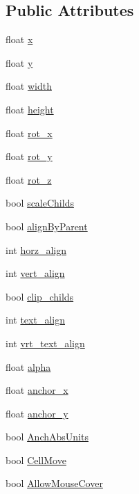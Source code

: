 \subsection*{Public Attributes}
\begin{DoxyCompactItemize}
\item 
float \hyperlink{class_n_g_u_i_symbol_inst_a1616f818b1c5b63b2194e01cbeab360d}{x}
\item 
float \hyperlink{class_n_g_u_i_symbol_inst_abcb24ffd0004c8bc11970c869b918250}{y}
\item 
float \hyperlink{class_n_g_u_i_symbol_inst_a0fc697d401fef1258dbf28bbba42a4d7}{width}
\item 
float \hyperlink{class_n_g_u_i_symbol_inst_a1c0ad8b480d3911404671ca978b947cb}{height}
\item 
float \hyperlink{class_n_g_u_i_symbol_inst_a20bbcca67767c0ed9b3e40e6f3cd0357}{rot\+\_\+x}
\item 
float \hyperlink{class_n_g_u_i_symbol_inst_ac63da3521f289b06c108fa3d6ff380e1}{rot\+\_\+y}
\item 
float \hyperlink{class_n_g_u_i_symbol_inst_a045dc487c09e6c2b2fad30c3b013bc09}{rot\+\_\+z}
\item 
bool \hyperlink{class_n_g_u_i_symbol_inst_a582dd58d99a137dca1c1ec8d8acca4e2}{scale\+Childs}
\item 
bool \hyperlink{class_n_g_u_i_symbol_inst_a2cecb575b74c18fa4a0469d54cd8d52e}{align\+By\+Parent}
\item 
int \hyperlink{class_n_g_u_i_symbol_inst_a08a1618237027dd91cdab7928ff9ad48}{horz\+\_\+align}
\item 
int \hyperlink{class_n_g_u_i_symbol_inst_a2963382c47b7030d04c0a455033da810}{vert\+\_\+align}
\item 
bool \hyperlink{class_n_g_u_i_symbol_inst_ad091c8c1a934c1d782102e1e2b99a6a8}{clip\+\_\+childs}
\item 
int \hyperlink{class_n_g_u_i_symbol_inst_ac95251a56a969ff32c54d4f671447e57}{text\+\_\+align}
\item 
int \hyperlink{class_n_g_u_i_symbol_inst_a61a957c21ef7c53e65b26e4e51afd9e6}{vrt\+\_\+text\+\_\+align}
\item 
float \hyperlink{class_n_g_u_i_symbol_inst_aa6e62a5b58acf66f353aedd02d15c0cb}{alpha}
\item 
float \hyperlink{class_n_g_u_i_symbol_inst_abd144efc0c210bcb26c85282e3054d3b}{anchor\+\_\+x}
\item 
float \hyperlink{class_n_g_u_i_symbol_inst_a659ec50b2235628768270fef51ba5bbc}{anchor\+\_\+y}
\item 
bool \hyperlink{class_n_g_u_i_symbol_inst_ae4200b78f09848062c71915e16c47724}{Anch\+Abs\+Units}
\item 
bool \hyperlink{class_n_g_u_i_symbol_inst_aa9ddb83854d5b3363998b250e976860d}{Cell\+Move}
\item 
bool \hyperlink{class_n_g_u_i_symbol_inst_a48281d9bc7e62f037fcb853f391b4d44}{Allow\+Mouse\+Cover}
\end{DoxyCompactItemize}


